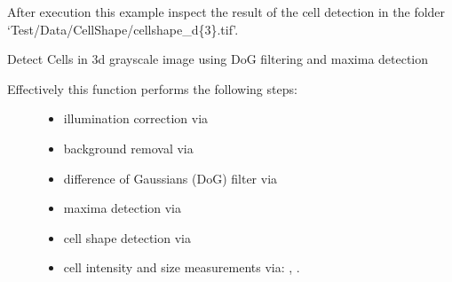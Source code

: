 \documentclass[letterpaper,10pt,english]{sphinxmanual}
\begin{document}
After execution this example inspect the result of the cell detection in
the folder `Test/Data/CellShape/cellshape\_d\{3\}.tif'.

\begin{fulllineitems}
\label{api/ClearMap.ImageProcessing:ClearMap.ImageProcessing.SpotDetection.detectSpots}
Detect Cells in 3d grayscale image using DoG filtering and maxima detection
\begin{description}
\item[{Effectively this function performs the following steps:}] \leavevmode\begin{itemize}
\item {} 
illumination correction via {\hyperref[api/ClearMap.ImageProcessing:ClearMap.ImageProcessing.IlluminationCorrection.correctIllumination]{\emph{}}}

\item {} 
background removal via {\hyperref[api/ClearMap.ImageProcessing:ClearMap.ImageProcessing.BackgroundRemoval.removeBackground]{\emph{}}}

\item {} 
difference of Gaussians (DoG) filter via 

\item {} 
maxima detection via {\hyperref[api/ClearMap.ImageProcessing:ClearMap.ImageProcessing.MaximaDetection.findExtendedMaxima]{\emph{}}}

\item {} 
cell shape detection via {\hyperref[api/ClearMap.ImageProcessing:ClearMap.ImageProcessing.CellSizeDetection.detectCellShape]{\emph{}}}

\item {} 
cell intensity and size measurements via: {\hyperref[api/ClearMap.ImageProcessing:ClearMap.ImageProcessing.CellSizeDetection.findCellIntensity]{\emph{}}},
{\hyperref[api/ClearMap.ImageProcessing:ClearMap.ImageProcessing.CellSizeDetection.findCellSize]{\emph{}}}.


\end{itemize}
\end{description}
\end{fulllineitems}
\end{document}
